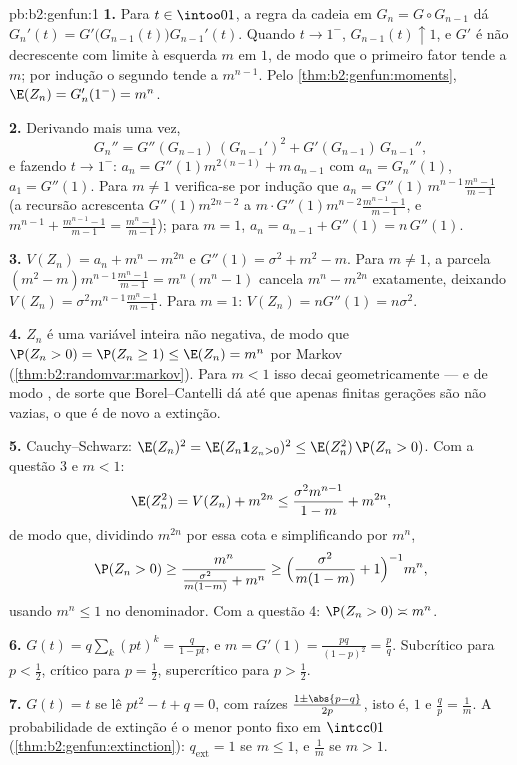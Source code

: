 \begin{solution}{pb:b2:genfun:1}
\textbf{1.} Para $t \in \intoo01$, a regra da cadeia em $G_n = G
\circ G_{n-1}$ dá $G_n'(t) =
G'\bigl(G_{n-1}(t)\bigr)G_{n-1}'(t)$. Quando $t \to 1^-$,
$G_{n-1}(t) \uparrow 1$, e $G'$ é não decrescente com
limite à esquerda $m$ em $1$, de modo que o primeiro fator tende a $m$; por
indução o segundo tende a $m^{n-1}$. Pelo
\cref{thm:b2:genfun:moments}, $\E(Z_n) = G_n'(1^-) = m^n$.

\textbf{2.} Derivando mais uma vez,
\[
G_n'' = G''(G_{n-1})\,(G_{n-1}')^2 +
G'(G_{n-1})\,G_{n-1}'',
\]
e fazendo $t \to 1^-$: $a_n = G''(1)m^{2(n-1)} + m\,
a_{n-1}$ com $a_n = G_n''(1)$, $a_1 = G''(1)$. Para $m \neq
1$ verifica-se por indução que $a_n = G''(1)\,m^{n-1}
\frac{m^n - 1}{m - 1}$ (a recursão acrescenta $G''(1)m^{2n-2}$
a $m\cdot G''(1)m^{n-2}\frac{m^{n-1}-1}{m-1}$, e
$m^{n-1} + \frac{m^{n-1}-1}{m-1} = \frac{m^n - 1}{m-1}$);
para $m = 1$, $a_n = a_{n-1} + G''(1) = n\,G''(1)$.

\textbf{3.} $V(Z_n) = a_n + m^n - m^{2n}$ e $G''(1) =
\sigma^2 + m^2 - m$. Para $m \neq 1$, a parcela $(m^2 -
m)m^{n-1}\frac{m^n-1}{m-1} = m^n(m^n - 1)$ cancela $m^n -
m^{2n}$ exatamente, deixando $V(Z_n) =
\sigma^2m^{n-1}\frac{m^n-1}{m-1}$. Para $m = 1$: $V(Z_n) =
nG''(1) = n\sigma^2$.

\textbf{4.} $Z_n$ é uma variável inteira não negativa, de modo que
$\P(Z_n > 0) = \P(Z_n \geq 1) \leq \E(Z_n) = m^n$ por Markov
(\cref{thm:b2:randomvar:markov}). Para $m < 1$ isso decai
geometricamente --- e de modo , de sorte que Borel--Cantelli dá até
que apenas finitas gerações são não vazias, o que é
de novo a extinção.

\textbf{5.} Cauchy--Schwarz: $\E(Z_n)^2 = \E(Z_n\mathbf
1_{Z_n>0})^2 \leq \E(Z_n^2)\,\P(Z_n > 0)$. Com a questão 3
e $m < 1$:
\[
\E(Z_n^2) = V(Z_n) + m^{2n}
\leq \frac{\sigma^2m^{n-1}}{1-m} + m^{2n},
\]
de modo que, dividindo $m^{2n}$ por essa cota e simplificando por
$m^n$,
\[
\P(Z_n > 0) \geq \frac{m^n}{\frac{\sigma^2}{m(1-m)} + m^n}
\geq \Bigl(\frac{\sigma^2}{m(1-m)} + 1\Bigr)^{-1}m^n ,
\]
usando $m^n \leq 1$ no denominador. Com a questão 4:
$\P(Z_n > 0) \asymp m^n$.

\textbf{6.} $G(t) = q\sum_k(pt)^k = \frac{q}{1 - pt}$, e $m
= G'(1) = \frac{pq}{(1-p)^2} = \frac pq$. Subcrítico para $p
< \frac12$, crítico para $p = \frac12$, supercrítico para $p
> \frac12$.

\textbf{7.} $G(t) = t$ se lê $pt^2 - t + q = 0$, com raízes
$\frac{1 \pm \abs{p - q}}{2p}$, isto é, $1$ e $\frac qp =
\frac1m$. A probabilidade de extinção é o menor ponto
fixo em $\intcc01$ (\cref{thm:b2:genfun:extinction}):
$q_{\mathrm{ext}} = 1$ se $m \leq 1$, e $\frac1m$ se $m >
1$.


\end{solution}
